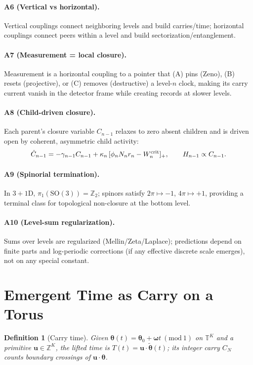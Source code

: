 \documentclass[11pt]{article}
\newtheorem{definition}{Definition}
\newcommand{\TT}{\mathbb T}
\newcommand{\ZZ}{\mathbb Z}
\newcommand{\vect}[1]{\boldsymbol{#1}}
\begin{document}
\paragraph{A6 (Vertical vs horizontal).}
Vertical couplings connect neighboring levels and build carries/time; horizontal couplings connect peers within a level and build sectorization/entanglement.

\paragraph{A7 (Measurement = local closure).}
Measurement is a horizontal coupling to a pointer that (A) pins (Zeno), (B) resets (projective), or (C) removes (destructive) a level-$n$ clock, making its carry current vanish in the detector frame while creating records at slower levels.

\paragraph{A8 (Child-driven closure).}
Each parent’s closure variable $C_{n-1}$ relaxes to zero absent children and is driven open by coherent, asymmetric child activity:
\begin{equation}
\dot C_{n-1}=-\gamma_{n-1}C_{n-1}+\kappa_n\,[\phi_n N_n r_n - W^{\rm crit}_n]_+,\qquad H_{n-1}\propto C_{n-1}.
\end{equation}

\paragraph{A9 (Spinorial termination).}
In $3{+}1$D, $\pi_1(\mathrm{SO}(3))=\ZZ_2$; spinors satisfy $2\pi\mapsto-1$, $4\pi\mapsto+1$, providing a terminal class for topological non-closure at the bottom level.

\paragraph{A10 (Level-sum regularization).}
Sums over levels are regularized (Mellin/Zeta/Laplace); predictions depend on finite parts and log-periodic corrections (if any effective discrete scale emerges), not on any special constant.

\section{Emergent Time as Carry on a Torus}

\begin{definition}[Carry time]
Given $\vect\theta(t)=\vect\theta_0+\vect\omega t\ (\mathrm{mod}\ 1)$ on $\TT^K$ and a primitive $\vect u\in\ZZ^K$, the lifted time is $T(t)=\vect u\!\cdot\!\tilde{\vect\theta}(t)$; its integer carry $C_N$ counts boundary crossings of $\vect u\!\cdot\!\vect\theta$.
\end{definition}
\end{document}
